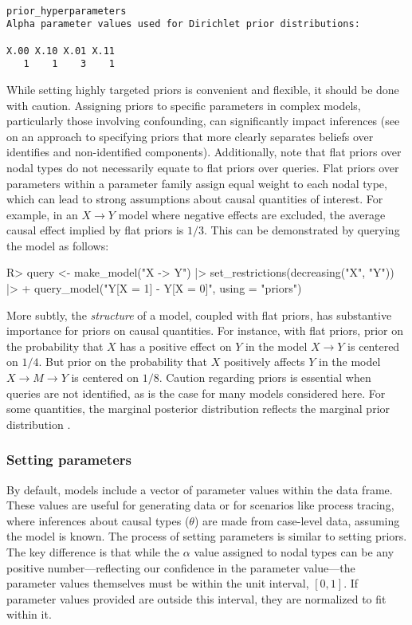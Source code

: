 \documentclass[
  11pt,
  article]{jss}
\renewcommand{\texttt}[1]{\code{#1}}
\begin{document}
\begin{verbatim}

prior_hyperparameters
Alpha parameter values used for Dirichlet prior distributions:

X.00 X.10 X.01 X.11 
   1    1    3    1 
\end{verbatim}

While setting highly targeted priors is convenient and flexible, it
should be done with caution. Assigning priors to specific parameters in
complex models, particularly those involving confounding, can
significantly impact inferences (see \citet{richardson2011transparent}
on an approach to specifying priors that more clearly separates beliefs
over identifies and non-identified components). Additionally, note that
flat priors over nodal types do not necessarily equate to flat priors
over queries. Flat priors over parameters within a parameter family
assign equal weight to each nodal type, which can lead to strong
assumptions about causal quantities of interest. For example, in an
\(X \rightarrow Y\) model where negative effects are excluded, the
average causal effect implied by flat priors is \(1/3\). This can be
demonstrated by querying the model as follows:

\begin{CodeInput}
R> query <- make_model("X -> Y") |> set_restrictions(decreasing("X", "Y")) |>
+    query_model("Y[X = 1] - Y[X = 0]", using = "priors")
\end{CodeInput}

More subtly, the \emph{structure} of a model, coupled with flat priors,
has substantive importance for priors on causal quantities. For
instance, with flat priors, prior on the probability that \(X\) has a
positive effect on \(Y\) in the model \(X \rightarrow Y\) is centered on
\(1/4\). But prior on the probability that \(X\) positively affects
\(Y\) in the model \(X \rightarrow M \rightarrow Y\) is centered on
\(1/8\). Caution regarding priors is essential when queries are not
identified, as is the case for many models considered here. For some
quantities, the marginal posterior distribution reflects the marginal
prior distribution \citep{poirier_revising_1998}.

\subsubsection{Setting parameters}\label{parameters}

By default, models include a vector of parameter values within the
\texttt{parameters\_df} data frame. These values are useful for
generating data or for scenarios like process tracing, where inferences
about causal types (\(\theta\)) are made from case-level data, assuming
the model is known. The process of setting parameters is similar to
setting priors. The key difference is that while the \(\alpha\) value
assigned to nodal types can be any positive number---reflecting our
confidence in the parameter value---the parameter values themselves must
be within the unit interval, \([0,1]\). If parameter values provided are
outside this interval, they are normalized to fit within it.
\end{document}
